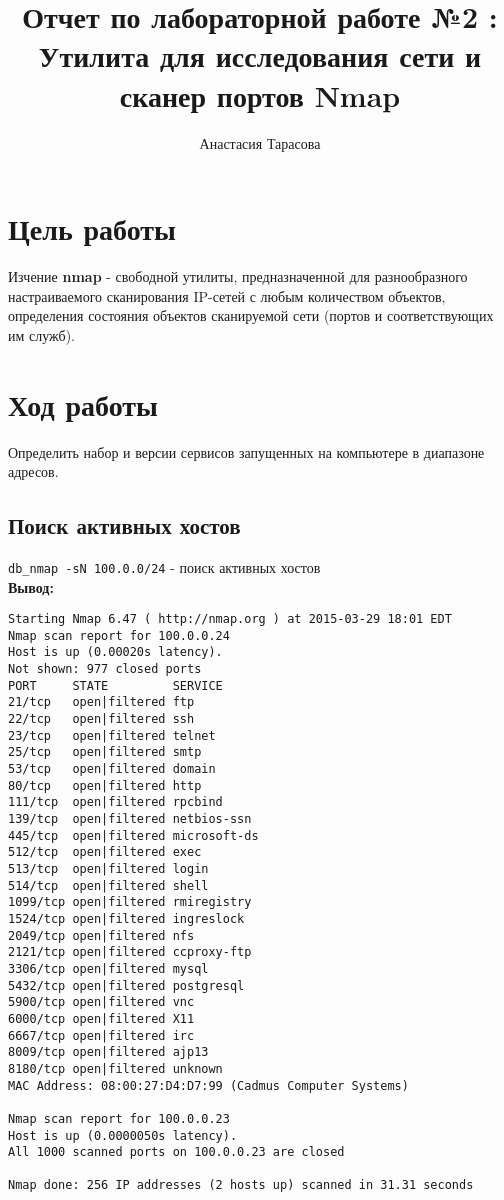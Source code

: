 \documentclass[12pt,a4paper]{article}
\author{Анастасия Тарасова}
\title{Отчет по лабораторной работе №2 :\\ Утилита для исследования сети и сканер
портов Nmap}
\begin{document}
\maketitle
\section{Цель работы}
Изчение \textbf{nmap} - свободной утилиты, предназначенной для разнообразного настраиваемого сканирования IP-сетей с любым количеством объектов, определения состояния объектов сканируемой сети (портов и соответствующих им служб).
\section{Ход работы}
Определить набор и версии сервисов запущенных на компьютере в диапазоне адресов.

\subsection{Поиск активных хостов}

\verb+db_nmap -sN 100.0.0/24+ - поиск активных хостов\\

\textbf{Вывод:}

\begin{lstlisting}
Starting Nmap 6.47 ( http://nmap.org ) at 2015-03-29 18:01 EDT
Nmap scan report for 100.0.0.24
Host is up (0.00020s latency).
Not shown: 977 closed ports
PORT     STATE         SERVICE
21/tcp   open|filtered ftp
22/tcp   open|filtered ssh
23/tcp   open|filtered telnet
25/tcp   open|filtered smtp
53/tcp   open|filtered domain
80/tcp   open|filtered http
111/tcp  open|filtered rpcbind
139/tcp  open|filtered netbios-ssn
445/tcp  open|filtered microsoft-ds
512/tcp  open|filtered exec
513/tcp  open|filtered login
514/tcp  open|filtered shell
1099/tcp open|filtered rmiregistry
1524/tcp open|filtered ingreslock
2049/tcp open|filtered nfs
2121/tcp open|filtered ccproxy-ftp
3306/tcp open|filtered mysql
5432/tcp open|filtered postgresql
5900/tcp open|filtered vnc
6000/tcp open|filtered X11
6667/tcp open|filtered irc
8009/tcp open|filtered ajp13
8180/tcp open|filtered unknown
MAC Address: 08:00:27:D4:D7:99 (Cadmus Computer Systems)

Nmap scan report for 100.0.0.23
Host is up (0.0000050s latency).
All 1000 scanned ports on 100.0.0.23 are closed

Nmap done: 256 IP addresses (2 hosts up) scanned in 31.31 seconds

\end{lstlisting}
\newpage
\end{document}
